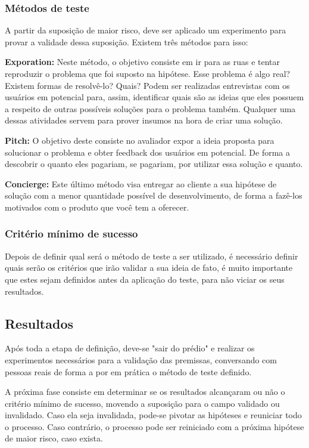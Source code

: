 \subsubsection {Métodos de teste}

A partir da suposição de maior risco, deve ser aplicado um experimento para provar a validade dessa suposição. Existem três métodos para isso:

\textbf{Exporation:} Neste método, o objetivo consiste em ir para as ruas e tentar reproduzir o problema que foi suposto na hipótese. Esse problema é algo real? Existem formas de resolvê-lo? Quais? Podem ser realizadas entrevistas com os usuários em potencial para, assim, identificar quais são as ideias que eles possuem a respeito de outras possíveis soluções para o problema também. Qualquer uma dessas atividades servem para prover insumos na hora de criar uma solução.

\textbf{Pitch:} O objetivo deste consiste no avaliador expor a ideia proposta para solucionar o problema e obter feedback dos usuários em potencial. De forma a descobrir o quanto eles pagariam, se pagariam, por utilizar essa solução e quanto.

\textbf{Concierge:} Este último método visa entregar ao cliente a sua hipótese de solução com a menor quantidade possível de desenvolvimento, de forma a fazê-los motivados com o produto que você tem a oferecer.

\subsubsection {Critério mínimo de sucesso}
Depois de definir qual será o método de teste a ser utilizado, é necessário definir quais serão os critérios que irão validar a sua ideia de fato, é muito importante que estes sejam definidos antes da aplicação do teste, para não viciar os seus resultados.

\subsection {Resultados}
Após toda a etapa de definição, deve-se "sair do prédio"  e realizar os experimentos necessários para a validação das premissas, conversando com pessoas reais de forma a por em prática o método de teste definido. 

A próxima fase consiste em determinar se os resultados alcançaram ou não o critério mínimo de sucesso, movendo a suposição para o campo validado ou invalidado. Caso ela seja invalidada, pode-se pivotar as hipóteses e reuniciar todo o processo. Caso contrário, o processo pode ser reiniciado com a próxima hipótese de maior risco, caso exista.


